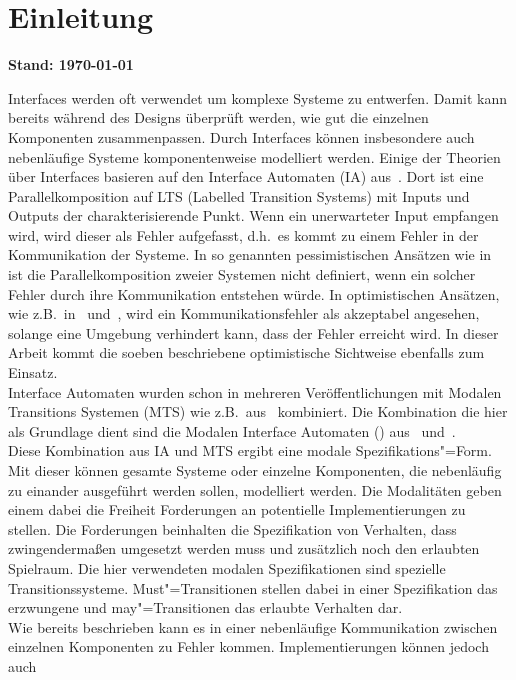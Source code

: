 \chapter*{Einleitung}
{\large\textbf{Stand: \today}}

Interfaces werden oft verwendet um komplexe Systeme zu entwerfen. Damit kann
bereits während des Designs überprüft werden, wie gut die einzelnen Komponenten
zusammenpassen. Durch Interfaces können insbesondere auch nebenläufige
Systeme komponentenweise modelliert werden. Einige der Theorien über Interfaces
basieren auf den Interface Automaten (IA) aus~\cite{Alfaro2004}. Dort ist eine
Parallelkomposition auf LTS (Labelled Transition Systems) mit Inputs und
Outputs der charakterisierende Punkt. Wenn ein unerwarteter Input empfangen
wird, wird dieser als Fehler aufgefasst, d.h.\ es kommt zu einem Fehler in der
Kommunikation der Systeme. In so genannten pessimistischen Ansätzen wie
in~\cite{Bauer2010} ist die Parallelkomposition zweier Systemen nicht
definiert, wenn ein solcher Fehler durch ihre Kommunikation entstehen würde. In
optimistischen Ansätzen, wie z.B.\ in~\cite{Luttgen2013MIA1}
und~\cite{Vogler2016MIA3}, wird ein Kommunikationsfehler als akzeptabel
angesehen, solange eine Umgebung verhindert kann, dass der Fehler
erreicht wird. In dieser Arbeit kommt die soeben beschriebene optimistische
Sichtweise ebenfalls zum Einsatz.\\
Interface Automaten wurden schon in mehreren Veröffentlichungen mit Modalen
Transitions Systemen (MTS) wie z.B.\ aus~\cite{Larsen1989} kombiniert. Die
Kombination die hier als Grundlage dient sind die Modalen Interface Automaten
(\MIA{}) aus~\cite{Luttgen2013MIA1} und~\cite{Vogler2016MIA3}.\\
Diese Kombination aus IA und MTS ergibt eine modale Spezifikations"=Form. Mit
dieser können gesamte Systeme oder einzelne Komponenten, die nebenläufig zu
einander ausgeführt werden sollen, modelliert werden. Die Modalitäten geben
einem dabei die Freiheit Forderungen an potentielle Implementierungen zu
stellen. Die Forderungen beinhalten die Spezifikation von Verhalten, dass
zwingendermaßen umgesetzt werden muss und zusätzlich noch den erlaubten
Spielraum. Die hier verwendeten modalen Spezifikationen sind spezielle
Transitionssysteme. Must"=Transitionen stellen dabei in einer Spezifikation das
erzwungene und may"=Transitionen das erlaubte Verhalten dar.\\
Wie bereits beschrieben kann es in einer nebenläufige Kommunikation zwischen
einzelnen Komponenten zu Fehler kommen. Implementierungen können jedoch auch
